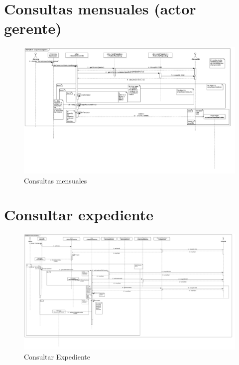 \newpage
\section{Consultas mensuales (actor gerente)}

\begin{figure}[htbp!]
		\centering
			\includegraphics[width=1\textwidth]{uml/DiagramasSecuencia/RubenMurga/getConsultasMes}
		\caption{Consultas mensuales}
	\end{figure}

\newpage
\section{Consultar expediente}
\begin{figure}[htbp!]
		\centering
			\includegraphics[width=1\textwidth]{uml/DiagramasSecuencia/RubenMurga/getExpediente}
		\caption{Consultar Expediente}
	\end{figure}
\newpage

